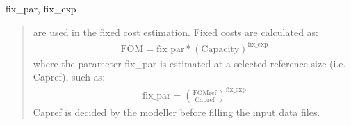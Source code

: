 \documentclass[letterpaper,10pt,english]{sphinxmanual}
\begin{document}
fix\_par, fix\_exp
\begin{quote}

are used in the fixed cost estimation. Fixed costs are calculated as:
\begin{equation*}
\begin{split}\text{FOM} = \text{fix\_par} * (\text{Capacity})^\text{fix\_exp}\end{split}
\end{equation*}
where the parameter fix\_par is estimated at a selected reference size (i.e. Capref),
such as:
\begin{equation*}
\begin{split}\text{fix\_par} = \left(
   \frac{\text{FOMref}}{\text{Capref}}
\right)^{\text{fix\_exp}}\end{split}
\end{equation*}
Capref is decided by the modeller before filling the input data files.
\end{quote}
\end{document}
